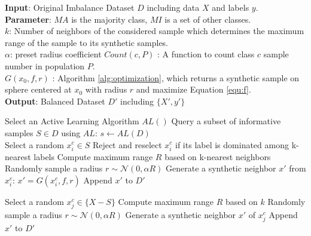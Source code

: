 \begin{algorithm}[htbp]
	\caption{\Methodname}
	
	\begin{flushleft}
		\textbf{Input}: Original Imbalance Dataset $D$ including data $X$ and labels $y$.\\
		\textbf{Parameter}: 
		$MA$ is the majority class, $MI$ is a set of other classes.\\
		$k$: Number of  neighbors of the considered sample which determines the maximum range of the sample to its synthetic samples.\\ 
		$\alpha$: preset radius coefficient
		$Count(c, P)$ : A function to count class $c$ sample number in population $P$.\\
		$G(x_0,f,r)$ : Algorithm \ref{alg:optimization}, which returns a synthetic sample on sphere centered at $x_0$ with radius $r$ and maximize Equation \ref{equ:f}.  \\
		\textbf{Output}: Balanced Dataset $D'$ including $\{X',y'\}$
		\begin{algorithmic}[1]
			\STATE Select an Active Learning Algorithm $AL()$
			\STATE Query a subset of informative samples $S \in D$  using $AL$:
			$s  \leftarrow AL(D) $	\\
			
			\STATE Select a random $x_i^c \in S$
			\STATE Reject and reselect $x_i^c$ if its label is dominated among k-nearest labels
			\STATE Compute maximum range $R$ based on k-nearest neighbors
			\STATE Randomly sample a radius $r \sim \mathcal{N}(0,\alpha R)$
			\STATE Generate a synthetic neighbor $x'$ from $x_i^c$:
			$x'=G(x_i^c,f,r)$ 
			\STATE Append $x'$ to $D'$
			\ENDWHILE
			\ENDFOR
			
			\STATE Select a random $x_j^c \in \{X-S\}$
			\STATE Compute maximum range $R$ based on $k$
			\STATE Randomly sample a radius $r \sim \mathcal{N}(0,\alpha R)$
			\STATE Generate a synthetic neighbor $x'$ of $x_j^c$ 
			\STATE Append $x'$ to $D'$
			\ENDWHILE
			\ENDFOR
			\RETURN 
		\end{algorithmic}
	\end{flushleft}
	\label{alg:SIMPOR}
\end{algorithm}